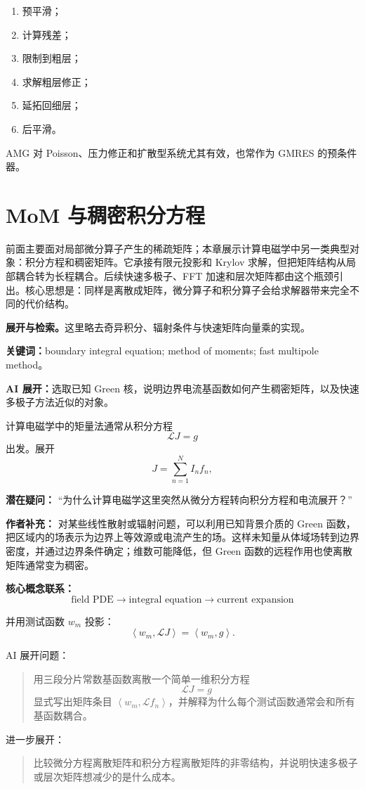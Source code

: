 \documentclass[11pt,openany]{ctexbook}
\newcommand{\Lop}{\mathcal L}
\newcommand{\avg}[1]{\left\langle #1\right\rangle}
\newcommand{\studyroute}[3]{%
  \par\smallskip\noindent\textbf{展开与检索。}#1\par
  \noindent\textbf{关键词：}#2。\par
  \noindent\textbf{AI 展开：}#3\par
}
\begin{document}
\begin{enumerate}
  \item 预平滑；
  \item 计算残差；
  \item 限制到粗层；
  \item 求解粗层修正；
  \item 延拓回细层；
  \item 后平滑。
\end{enumerate}

AMG 对 Poisson、压力修正和扩散型系统尤其有效，也常作为 GMRES 的预条件器。

\chapter{MoM 与稠密积分方程}

\begin{chaptersummary}
前面主要面对局部微分算子产生的稀疏矩阵；本章展示计算电磁学中另一类典型对象：积分方程和稠密矩阵。它承接有限元投影和 Krylov 求解，但把矩阵结构从局部耦合转为长程耦合。后续快速多极子、FFT 加速和层次矩阵都由这个瓶颈引出。核心思想是：同样是离散成矩阵，微分算子和积分算子会给求解器带来完全不同的代价结构。
\end{chaptersummary}
\studyroute{这里略去奇异积分、辐射条件与快速矩阵向量乘的实现。}{boundary integral equation; method of moments; fast multipole method}{选取已知 Green 核，说明边界电流基函数如何产生稠密矩阵，以及快速多极子方法近似的对象。}

计算电磁学中的矩量法通常从积分方程
\[
\Lop J=g
\]
出发。展开
\[
J=\sum_{n=1}^N I_nf_n,
\]

\begin{authornote}
\textbf{潜在疑问：}
“为什么计算电磁学这里突然从微分方程转向积分方程和电流展开？”

\textbf{作者补充：}
对某些线性散射或辐射问题，可以利用已知背景介质的 Green 函数，把区域内的场表示为边界上等效源或电流产生的场。这样未知量从体域场转到边界密度，并通过边界条件确定；维数可能降低，但 Green 函数的远程作用也使离散矩阵通常变为稠密。

\textbf{核心概念联系：}
\[
\text{field PDE}
\longrightarrow
\text{integral equation}
\longrightarrow
\text{current expansion}
\]
\end{authornote}

并用测试函数 \(w_m\) 投影：
\[
\avg{w_m,\Lop J}
=
\avg{w_m,g}.
\]

\begin{askai}
AI 展开问题：
\begin{quote}
用三段分片常数基函数离散一个简单一维积分方程
\[
\Lop J=g
\]
显式写出矩阵条目 \(\avg{w_m,\Lop f_n}\)，并解释为什么每个测试函数通常会和所有基函数耦合。
\end{quote}

进一步展开：
\begin{quote}
比较微分方程离散矩阵和积分方程离散矩阵的非零结构，并说明快速多极子或层次矩阵想减少的是什么成本。
\end{quote}
\end{askai}
\end{document}
